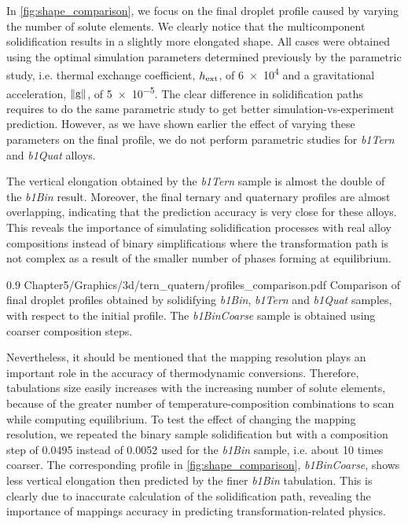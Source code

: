 In \cref{fig:shape_comparison}, we focus on the final droplet profile caused by varying the number of solute elements.
We clearly notice that the multicomponent solidification results in a slightly more elongated shape. 
All cases were obtained using the optimal simulation
parameters determined previously by the parametric study, i.e. thermal exchange coefficient, $h_{\text{ext}}$, of \SI{6e4}{\uhconvec} and a gravitational
acceleration, $\lVert \boldsymbol{\text{g}} \rVert$, of \SI{5e-5}{\uacceleration}. The clear difference in solidification paths requires to do the same 
parametric study to get better simulation-vs-experiment prediction. However, as we have shown earlier the effect of varying these parameters
on the final profile, we do not perform parametric studies for \emph{b1Tern} and \emph{b1Quat} alloys. 

The vertical elongation obtained by the \emph{b1Tern} sample is almost the double of the \emph{b1Bin} result. Moreover, the final ternary and quaternary
profiles are almost overlapping, indicating that the prediction accuracy is very close for these alloys. 
This reveals the importance of simulating solidification processes with real alloy compositions instead of binary simplifications
where the transformation path is not complex as a result of the smaller number of phases forming at equilibrium. 

\begin{figureth}
{0.9}
{Chapter5/Graphics/3d/tern_quatern/profiles_comparison.pdf}
{Comparison of final droplet profiles obtained by solidifying \emph{b1Bin}, \emph{b1Tern} and \emph{b1Quat} samples, with respect to the initial profile. 
The \emph{b1BinCoarse} sample
is obtained using coarser composition steps.}
\label{fig:shape_comparison}
\end{figureth}

Nevertheless, it should be mentioned that the mapping resolution plays an important role in the accuracy of thermodynamic conversions.
Therefore, tabulations size easily increases with the increasing number of solute elements, because of the greater number of temperature-composition 
combinations to scan while computing equilibrium. To test the effect of changing the mapping resolution, we repeated the binary sample solidification
but with a composition step of \SI{0.0495}{\ucomposition} instead of \SI{0.0052}{\ucomposition} used for the \emph{b1Bin} sample, i.e. about 10 times coarser. 
The corresponding profile in \cref{fig:shape_comparison}, \emph{b1BinCoarse}, shows less vertical elongation then predicted by the finer \emph{b1Bin} tabulation. 
This is clearly due to inaccurate calculation of the solidification path, revealing the importance of mappings accuracy in predicting transformation-related physics.

